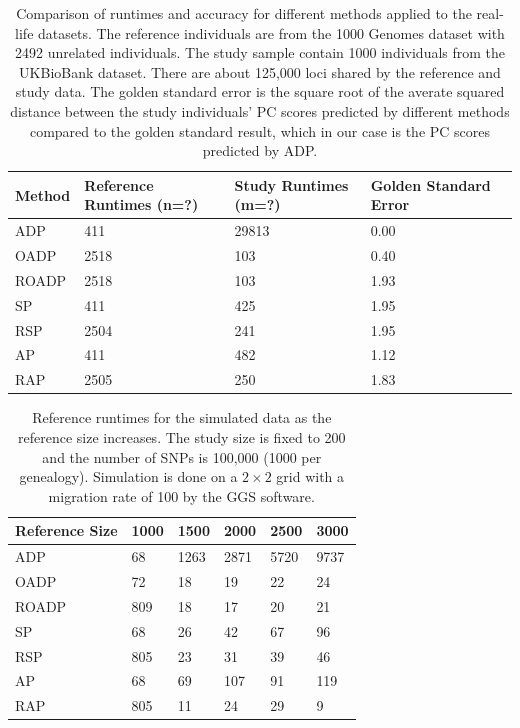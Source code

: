 \documentclass{article}
\begin{document}
\begin{table} 
  \centering
  \begin{tabular}{|l|l|l|l|l|}
    \hline
    Method & Reference Runtimes (n=?) & Study Runtimes (m=?)& Golden Standard Error \\ 
    \hline
    ADP & 411 & 29813 & 0.00 \\
    \hline
    OADP & 2518 & 103 & 0.40 \\
    \hline
    ROADP & 2518 & 103 & 1.93 \\
    \hline
    SP & 411 & 425 & 1.95 \\
    \hline
    RSP & 2504 & 241 & 1.95 \\
    \hline
    AP & 411 & 482 & 1.12 \\
    \hline
    RAP & 2505 & 250 & 1.83 \\ 
    \hline
  \end{tabular}
  \caption{
    Comparison of runtimes and accuracy for different methods applied to the real-life datasets.
    The reference individuals are from the 1000 Genomes dataset with 2492 unrelated individuals.
    The study sample contain 1000 individuals from the UKBioBank dataset.
    There are about 125,000 loci shared by the reference and study data.
    The golden standard error is the square root of the averate squared distance between the study individuals' PC scores predicted by different methods compared to the golden standard result, which in our case is the PC scores predicted by ADP.
  }
  \label{tbl:ukb}
\end{table} 

\begin{table}
  \centering
  \begin{tabular}{|l|l|l|l|l|l|}
    \hline
    Reference Size & 1000 & 1500 & 2000 & 2500 & 3000 \\
    \hline
    ADP        &  68  & 1263 & 2871 & 5720 & 9737 \\
    OADP       &  72  & 18   & 19   & 22   & 24   \\
    ROADP      & 809  & 18   & 17   & 20   & 21   \\
    SP         &  68  & 26   & 42   & 67   & 96   \\
    RSP        & 805  & 23   & 31   & 39   & 46   \\
    AP         &  68  & 69   & 107  & 91   & 119  \\
    RAP        & 805  & 11   & 24   & 29   & 9    \\
    \hline
  \end{tabular}
  \caption{
    Reference runtimes for the simulated data as the reference size increases.
    The study size is fixed to 200 and the number of SNPs is 100,000 (1000 per genealogy). 
    Simulation is done on a $2 \times 2$ grid with a migration rate of 100 by the GGS software. 
  }
  \label{tbl:nChg-runtimes-ref}
\end{table}
\end{document}
